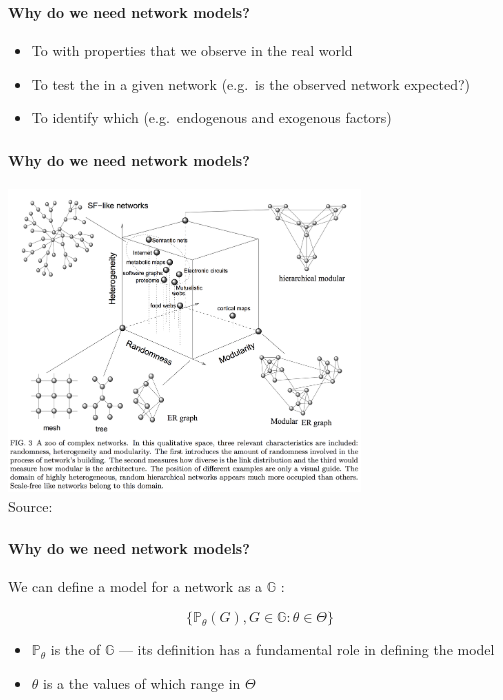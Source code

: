 \documentclass[8pt]{beamer}
\begin{document}
\begin{frame}
\frametitle{\insertsection}
\framesubtitle{Why do we need network models?}

\begin{itemize}
\item To {\color{blue}{generate networks}} with properties that we observe in the real world
\item To test the {\color{blue}{significance of certain characteristics}} in a given network (e.g.\ is the observed network expected?)
\item To identify which {\color{blue}{factors predict the formation of ties}}  (e.g.\ endogenous and exogenous factors)
\end{itemize}


\end{frame}


\begin{frame}
\frametitle{\insertsection}
\framesubtitle{Why do we need network models?}

\centering
\includegraphics[width=0.7\textwidth]{network_map}\\
\tiny Source: \cite{Sole2004}

\end{frame}



\begin{frame}
\frametitle{\insertsection}
\framesubtitle{Why do we need network models?}

We can define a model for a network as a {\color{blue}{collection of networks}} $\mathbb{G}$ \cite{Kolaczyk2014}:

\begin{equation*}
\{\mathbb{P}_{\theta}(G), G \in \mathbb{G}: \theta \in \Theta\}
\end{equation*}

\begin{itemize}
\item $\mathbb{P}_{\theta}$ is the {\color{blue}{probability distribution}} of $\mathbb{G}$ --- its definition has a fundamental role in defining the model
\item $\theta$ is a {\color{blue}{vector of parameters}} the values of which range in $\Theta$
\end{itemize}

\end{frame}
\end{document}
